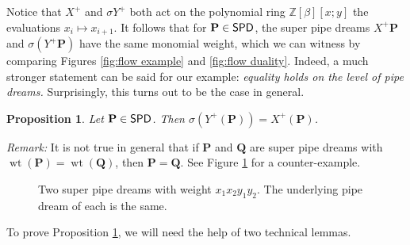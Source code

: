 \documentclass[11pt,reqno]{amsart} %
\makeatletter
\newcommand{\bbZ}{\mathbb{Z}}
\newcommand{\bfP}{\mathbf{P}}
\newcommand{\bfQ}{\mathbf{Q}}
\DeclareMathOperator{\wt}{wt}
\DeclareMathOperator{\SPD}{\sf{SPD}}
\newenvironment{shift}[1][(0,0)]{
    \begin{scope}[shift={#1}]
}{
    \end{scope}
}
\newtheorem{proposition}[theorem]{Proposition}
\theoremstyle{definition}
\newcommand{\drawSquare}[3][black,opacity=0.5]{
    \draw[#1,thin]
    (#2-0.5,#3+0.5) rectangle (#2+0.5,#3-0.5);
}
\newcommand{\drawGraySquare}[3][gray,opacity=0.3]{
    \filldraw[#1,thin]
    (#2-0.5,#3+0.5) rectangle (#2+0.5,#3-0.5);
}
\newcommand{\checkerradius}{0.38}
\newcommand{\drawXChecker}[2]{
    \fill[color=x color 2] (#1,#2) circle (\checkerradius);
    \fill[
        color=x color 1,
        pattern color=x color 1,
        pattern={Lines[distance=2pt]},
        thick
    ] (#1,#2) circle (\checkerradius);
    \draw[color=x color 1,thick] (#1,#2) circle (\checkerradius);
}
\newcommand{\drawYChecker}[2]{
    \fill[color=y color 2] (#1,#2) circle (\checkerradius);
    \fill[
        color=y color 1,
        pattern color=y color 1,
        pattern={Lines[distance=1.5pt,angle=90]},
    ] (#1,#2) circle (\checkerradius);
    \draw[color=y color 1, thick] (#1,#2) circle (\checkerradius);
}
\newcommand{\drawXYChecker}[2]{
    \drawXChecker{#1}{#2}
    \drawYChecker{#1-0.1}{#2+0.1}
}
\newcommand{\drawRCGraphTile}[3]{

    \ifnum #3=0 \fi %
    \ifnum #3=1 \drawXChecker{#1}{#2} \fi
    \ifnum #3=2 \drawYChecker{#1}{#2} \fi
    \ifnum #3=3 \drawXYChecker{#1}{#2} \fi
    \ifnum #3=4 \drawGraySquare{#1}{#2}\drawXChecker{#1}{#2} \fi
    \ifnum #3=5 \drawGraySquare{#1}{#2}\drawYChecker{#1}{#2} \fi
    \ifnum #3=6 \fi
    \ifnum #3=7 \fi
    \ifnum #3=8 \fi
    \ifnum #3=9 \drawGraySquare{#1}{#2} \fi
}
\newcommand{\drawRCGraph}[3]{
    \PD@i = 1
    \PD@j = 1
    \foreach \t in {#3}{
        \drawRCGraphTile{\number\PD@j}{-\number\PD@i}{\t}
        \drawSquare{\number\PD@j}{-\number\PD@i}
        
        \ifnum\PD@j < \numexpr#2\relax
            \global\advance\PD@j by 1
        \else
            \global\PD@j = 1
            \global\advance\PD@i by 1
        \fi
    }
}
\newcommand{\drawNorthLabels}[3]{
    \PD@j = 0
    \foreach \j in {#3}{
        \node at (#2+\PD@j,-#1) {\j};
        \global\advance\PD@j by 1
    }
}
\newcommand{\drawWestLabels}[3]{
    \PD@i = 0
    \foreach \i in {#3}{
        \node at (#2,-#1-\PD@i) {\i};
        \global\advance\PD@i by 1
    }
}
\makeatother
\begin{document}
Notice that $X^+$ and $\sigma Y^+$ both act on the polynomial ring $\bbZ[\beta][x;y]$ the evaluations $x_i\mapsto x_{i+1}$.
It follows that for $\bfP\in \SPD$, the super pipe dreams $X^+\bfP$ and $\sigma(Y^+\bfP)$ have the same monomial weight, which we can witness by comparing Figures \ref{fig:flow example} and \ref{fig:flow duality}.
Indeed, a much stronger statement can be said for our example: \textit{equality holds on the level of pipe dreams.}
Surprisingly, this turns out to be the case in general.

\begin{proposition}
\label{prop:flow symmetry}
Let $\bfP\in \SPD$.
Then $\sigma(Y^+(\bfP)) = X^+(\bfP)$.
\end{proposition}

\noindent
\textit{Remark:}\quad
It is not true in general that if $\bfP$ and $\bfQ$ are super pipe dreams with $\wt(\bfP) = \wt(\bfQ)$, then $\bfP = \bfQ$.
See Figure \ref{fig:same weight, different pipes} for a counter-example.
\vspace{4pt}

\begin{figure}
\caption{
    Two super pipe dreams with weight $x_1x_2y_1y_2$.
    The underlying pipe dream of each is the same.
}
\label{fig:same weight, different pipes}
\end{figure}

To prove Proposition \ref{prop:flow symmetry}, we will need the help of two technical lemmas.
\end{document}
